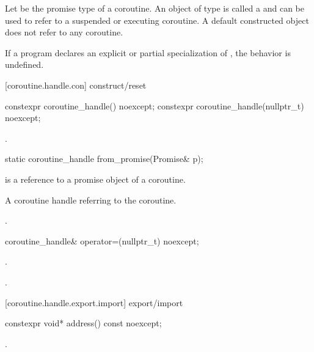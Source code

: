 \pnum
Let  be the promise type of 
a coroutine. An object of type
 is called a 
and can be used to refer to a suspended or executing coroutine.
A default constructed  object does not refer to any
coroutine.

\pnum
If a program declares an explicit or partial specialization of
, the behavior is undefined.

[coroutine.handle.con]{ construct/reset}

\begin{itemdecl}
constexpr coroutine_handle() noexcept;		
constexpr coroutine_handle(nullptr_t) noexcept;
\end{itemdecl}

\begin{itemdescr}
\pnum
\ensures {}.
\end{itemdescr}

\begin{itemdecl}
static coroutine_handle from_promise(Promise& p);
\end{itemdecl}

\begin{itemdescr}
\pnum
\requires {} is a reference to a promise object of a coroutine.
  
\pnum
\returns A coroutine handle  referring to the coroutine.
  
\pnum
\ensures {}.
\end{itemdescr}

\begin{itemdecl}
coroutine_handle& operator=(nullptr_t) noexcept;
\end{itemdecl}

\begin{itemdescr}
\pnum
\ensures {}.
  
\pnum
\returns {}.
\end{itemdescr}

[coroutine.handle.export.import]{ export/import}

\begin{itemdecl}
constexpr void* address() const noexcept;
\end{itemdecl}

\begin{itemdescr}
\pnum
\returns {}.
\end{itemdescr}

